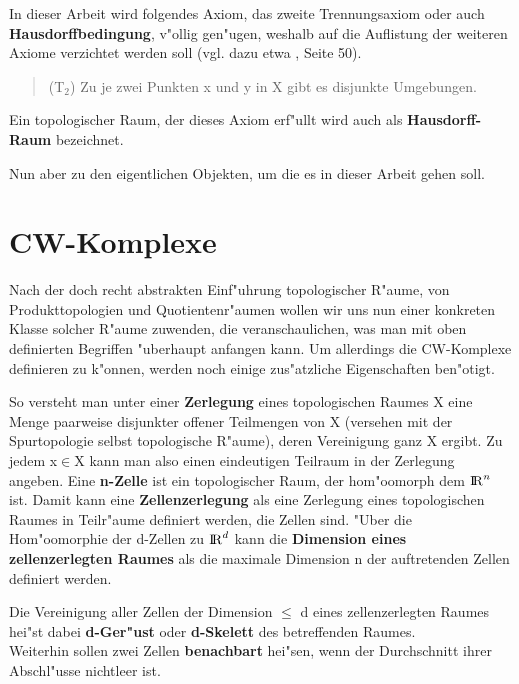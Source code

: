 In dieser Arbeit wird folgendes Axiom, das zweite Trennungsaxiom oder
auch {\bf Hausdorffbedingung}, v"ollig gen"ugen, weshalb auf die Auflistung
der weiteren Axiome verzichtet werden soll (vgl. dazu etwa \cite{Os:92},
Seite 50).
\begin{quote}
(T$_2$) Zu je zwei Punkten x und y in X gibt es disjunkte Umgebungen.
\end{quote}
Ein topologischer Raum, der dieses Axiom erf"ullt wird auch als
{\bf Hausdorff-Raum} bezeichnet.

Nun aber zu den eigentlichen Objekten, um die es in dieser Arbeit gehen soll.

\section{CW-Komplexe}

Nach der doch recht abstrakten Einf"uhrung topologischer R"aume, von
Produkttopologien und Quotientenr"aumen wollen wir uns nun einer konkreten
Klasse solcher R"aume zuwenden, die veranschaulichen, was man mit oben
definierten Begriffen "uberhaupt anfangen kann. Um allerdings die CW-Komplexe
definieren zu k"onnen, werden noch einige zus"atzliche Eigenschaften ben"otigt.

So versteht man unter einer {\bf Zerlegung} eines topologischen
Raumes X eine Menge paarweise disjunkter offener Teilmengen von X (versehen mit
der Spurtopologie selbst topologische R"aume), deren Vereinigung ganz X ergibt.
Zu jedem x$\in$X kann man also einen eindeutigen Teilraum in der Zerlegung
angeben. Eine {\bf n-Zelle} ist ein topologischer Raum,
der hom"oomorph dem $\mbox{$\rm I\!R$}^n$ ist. Damit kann eine {\bf Zellenzerlegung}
 als eine Zerlegung eines topologischen Raumes in
Teilr"aume definiert werden, die Zellen sind. "Uber die Hom"oomorphie der
d-Zellen zu $\mbox{$\rm I\!R$}^d$ kann die {\bf Dimension eines zellenzerlegten Raumes} als die
maximale Dimension n der auftretenden Zellen definiert werden.

Die Vereinigung aller Zellen der Dimension $\leq$ d eines zellenzerlegten
Raumes hei"st dabei {\bf d-Ger"ust} oder {\bf d-Skelett} des betreffenden Raumes.
\\
Weiterhin sollen zwei Zellen {\bf benachbart} hei"sen, wenn der
Durchschnitt ihrer Abschl"usse nichtleer ist.

